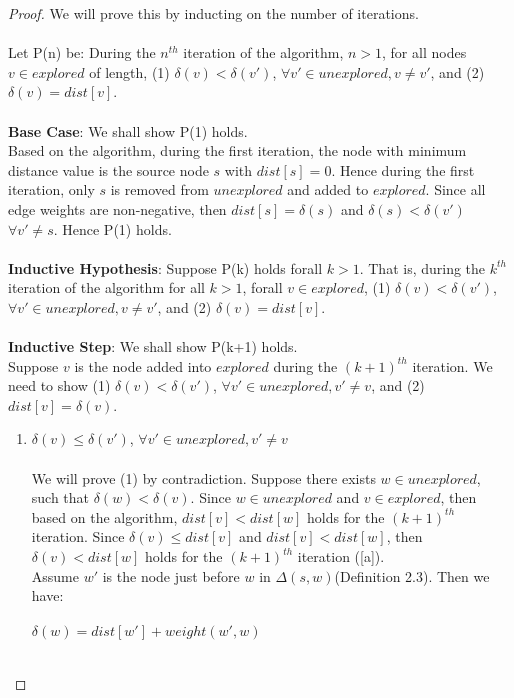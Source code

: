 \documentclass[11pt, oneside]{article}   	%
\newcommand\ftab[1][5cm]{\hspace*{#1}}
\theoremstyle{definition}
\begin{document}
\begin{proof}
We will prove this by inducting on the number of iterations. 
\\\\
Let P(n) be: During the $n^{th}$ iteration of the algorithm, $n > 1$, for all nodes $v \in explored$ of length, (1) $\delta(v) < \delta(v')$, $\forall v' \in unexplored, v \neq v'$, and (2) $\delta(v) = dist[v]$. 
\\\\
\textbf{Base Case}: 
We shall show P(1) holds. 
\\
Based on the algorithm, during the first iteration, the node with minimum distance value is the source node $s$ with $dist[s] = 0$. Hence during the first iteration, only $s$ is removed from $unexplored$ and added to $explored$. Since all edge weights are non-negative, then $dist[s] = \delta(s)$ and $\delta(s) < \delta(v')$ $\forall v' \neq s$. Hence P(1) holds. 
\\\\
\textbf{Inductive Hypothesis}: Suppose P(k) holds forall $k > 1$. That is, during the $k^{th}$ iteration of the algorithm for all $k > 1$, forall $v \in explored$, (1) $\delta(v) < \delta(v')$, $\forall v' \in unexplored, v \neq v'$, and (2) $\delta(v) = dist[v]$. 
\\\\
\textbf{Inductive Step}: We shall show P(k+1) holds. 
\\ 
Suppose $v$ is the node added into $explored$ during the $(k+1)^{th}$ iteration. We need to show (1) $\delta(v) < \delta(v')$, $\forall v' \in unexplored, v' \neq v$, and (2) $dist[v] = \delta(v)$. 
\begin{enumerate}
\item $\delta(v) \leq \delta(v')$, $\forall v' \in unexplored, v' \neq v$
\\\\
We will prove (1) by contradiction. Suppose there exists $w \in unexplored$, such that $\delta(w) < \delta(v)$. Since $w \in unexplored$ and $v \in explored$, then based on the algorithm, $dist[v] < dist[w]$ holds for the $(k+1)^{th}$ iteration. Since $\delta(v) \leq dist[v]$ and $dist[v] < dist[w]$, then $\delta(v) < dist[w]$ holds for the $(k+1)^{th}$ iteration ([a]). 
\\
Assume $w'$ is the node just before $w$ in $\Delta(s,w)$(Definition 2.3). Then we have:
\\\\
\ftab $\delta(w) = dist[w'] + weight(w', w)$ 
\\\\

\end{enumerate}
\end{proof}
\end{document}
